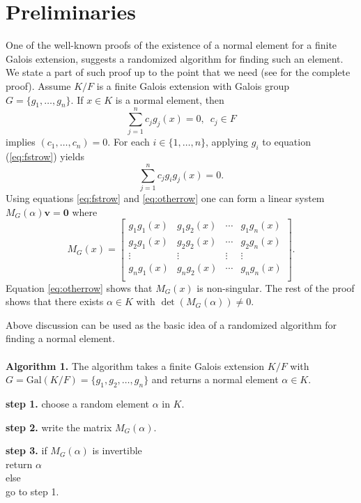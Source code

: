 \documentclass[sigconf]{acmart}
\theoremstyle{acmplain}
\begin{document}
\section{Preliminaries} \label{sec:pre}
One of the well-known proofs of the existence of a normal element for a finite Galois extension, suggests a randomized 
algorithm for finding such an element. We state a part of such proof up to the point that we need (see \cite[Theorem 6.13.1]{Lang} for the complete proof). Assume $K/F$ is a finite Galois extension with Galois group $G = \lbrace g_1 , \ldots ,
 g_n \rbrace$. If $x \in K$ is a normal element, then
 \begin{equation}\label{eq:fstrow}
 \sum_{j=1}^n 
 c_j g_j(x)=0, \,\,\, c_j \in F 
 \end{equation} 
 implies $(c_1, \ldots ,c_n) = 0$. For each $i \in \lbrace 1, \ldots , n\rbrace$, applying $g_i$ to equation (\ref{eq:fstrow}) yields
\begin{equation} \label{eq:otherrow}
 \sum_{j=1}^n 
 c_j g_i g_j(x)=0.
 \end{equation}
 Using equations \ref{eq:fstrow} and \ref{eq:otherrow} one can form a linear system $M_G(\alpha)\textbf{v} = \textbf{0}$ where 
 $$ M_G(x) =
\begin{bmatrix}
g_1 g_1(x) & g_1 g_2(x) & \cdots & g_1 g_n(x) \\
g_2 g_1(x) & g_2 g_2(x) & \cdots & g_2 g_n(x) \\
\vdots		& \vdots	& \vdots & \vdots \\
g_n g_1(x) & g_n g_2(x) & \cdots & g_n g_n(x) \\
\end{bmatrix}. 
 $$
 Equation \ref{eq:otherrow} shows that $M_G(x)$ is non-singular. The rest of the proof shows that there exists $\alpha \in K$ with $\det(M_G(\alpha))\neq 0$.
 
 
 Above discussion can be used as the basic idea of a randomized algorithm for finding a
 normal element.\\
 \\
 \textbf{Algorithm 1.} \label{alg:naive}
 The algorithm takes a finite Galois extension $K/F$ with 
 $G =  \mathrm{Gal}(K/F) = \lbrace g_1, g_2, \ldots , g_n \rbrace$ and returns a normal
 element $\alpha \in K$.
 \begin{description}
 \item \textbf{step 1.} choose a random element $\alpha$ in $K$.
 \item \textbf{step 2.} write the matrix $M_G(\alpha)$.
 \item \textbf{step 3.} if $ M_G(\alpha)$ is invertible\\
 \hspace{10cm} return $\alpha$\\
 \hspace{2cm} else \\
 \hspace{5cm} go to step 1.\\  
 \end{description}
 
\end{document}
